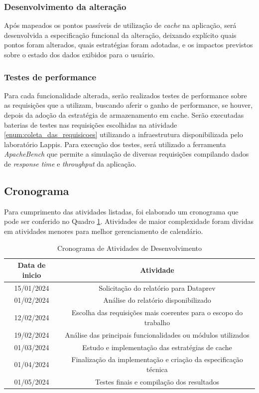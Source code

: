 \subsubsection{Desenvolvimento da alteração}

Após mapeados os pontos passíveis de utilização de \textit{cache} na aplicação, será desenvolvida a especificação funcional da alteração, deixando explícito quais pontos foram alterados, quais estratégias foram adotadas, e os impactos previstos sobre o estado dos dados exibidos para o usuário.

\subsubsection{Testes de performance}

Para cada funcionalidade alterada, serão realizados testes de performance sobre as requisições que a utilizam, buscando aferir o ganho de performance, se houver, depois da adoção da estratégia de armazenamento em cache. Serão executadas baterias de testes nas requisições escolhidas na atividade \ref{enum:coleta_das_requisicoes} utilizando a infraestrutura disponibilizada pelo laboratório Lappis. Para execução dos testes, será utilizado a ferramenta \textit{ApacheBench} que permite a simulação de diversas requisições compilando dados de \textit{response time} e \textit{throughput} da aplicação.

\subsection{Cronograma}

Para cumprimento das atividades listadas, foi elaborado um cronograma que pode ser conferido no Quadro \ref{tab:cronograma-tcc2}. Atividades de maior complexidade foram dividas em atividades menores para melhor gerenciamento de calendário.

\begin{table}
  \centering
  \caption{Cronograma de Atividades de Desenvolvimento}
  \label{tab:cronograma-tcc2}
  \begin{tabular}{|c|c|}
    \hline
    Data de inicio & Atividade \\
    \hline
    15/01/2024 & Solicitação do relatório para Dataprev \\
    01/02/2024 & Análise do relatório disponibilizado \\
    12/02/2024 & Escolha das requisições mais coerentes para o escopo do trabalho \\
    19/02/2024 & Análise das principais funcionalidades ou módulos utilizados \\
    01/03/2024 & Estudo e implementação das estratégias de cache \\
    01/04/2024 & Finalização da implementação e criação da especificação técnica \\
    01/05/2024 & Testes finais e compilação dos resultados \\
    \hline
  \end{tabular}
\end{table}

